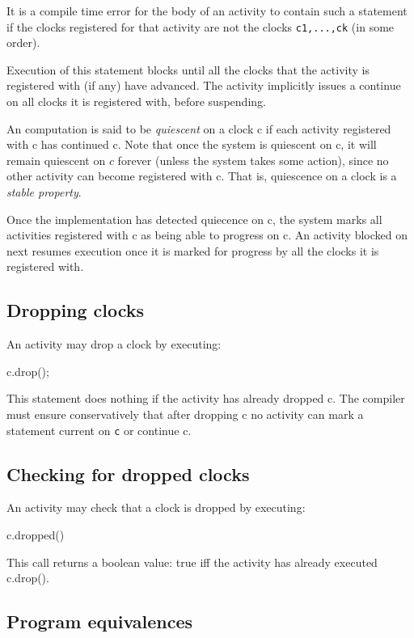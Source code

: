 \noindent 
It is a compile time error for the body of an activity to contain such
a statement if the clocks registered for that activity are not the clocks
{\tt c1,...,ck} (in some order).


Execution of this statement blocks until all the clocks that the
activity is registered with (if any) have advanced. The activity
implicitly issues a {\cf continue} on all clocks it is registered
with, before suspending.

An \Xten{} computation is said to be {\em quiescent} on a clock {\cf
c} if each activity registered with {\cf c} has continued {\cf c}.
Note that once the system is quiescent on {\cf c}, it will remain
quiescent on $c$ forever (unless the system takes some action), since
no other activity can become registered with {\cf c}.  That is,
quiescence on a clock is a {\em stable property}.

Once the implementation has detected quiecence on {\cf c}, the system
marks all activities registered with {\cf c} as being able to progress
on {\cf c}. An activity blocked on {\cf next} resumes execution once
it is marked for progress by all the clocks it is registered with.


\subsection{Dropping clocks}
An activity may drop a clock by executing:
\begin{x10}
c.drop();
\end{x10}

\noindent{} 
This statement does nothing if the activity has already dropped {\cf c}. 
The compiler must ensure conservatively that after dropping {\cf c} no
activity can mark a statement current on {\tt c} or continue {\cf c}.

\subsection{Checking for dropped clocks}
An activity may check that a clock is dropped by executing:
\begin{x10}
c.dropped()
\end{x10}
\noindent This call returns a {\cf boolean} value: {\cf true} iff the activity has already executed {\cf c.drop()}.

\subsection{Program equivalences}

